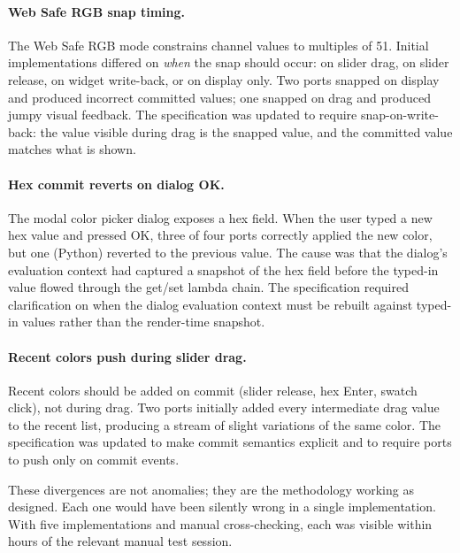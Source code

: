 \documentclass[10pt]{article}
\begin{document}
\paragraph{Web Safe RGB snap timing.} The Web Safe RGB mode constrains
channel values to multiples of 51. Initial implementations differed on
\emph{when} the snap should occur: on slider drag, on slider release, on
widget write-back, or on display only. Two ports snapped on display and
produced incorrect committed values; one snapped on drag and produced
jumpy visual feedback. The specification was updated to require
snap-on-write-back: the value visible during drag is the snapped value,
and the committed value matches what is shown.

\paragraph{Hex commit reverts on dialog OK.} The modal color picker dialog
exposes a hex field. When the user typed a new hex value and pressed OK,
three of four ports correctly applied the new color, but one (Python)
reverted to the previous value. The cause was that the dialog's
evaluation context had captured a snapshot of the hex field before the
typed-in value flowed through the get/set lambda chain. The specification
required clarification on when the dialog evaluation context must be
rebuilt against typed-in values rather than the render-time snapshot.

\paragraph{Recent colors push during slider drag.} Recent colors should be
added on commit (slider release, hex Enter, swatch click), not during
drag. Two ports initially added every intermediate drag value to the
recent list, producing a stream of slight variations of the same color.
The specification was updated to make commit semantics explicit and to
require ports to push only on commit events.

These divergences are not anomalies; they are the methodology working as
designed. Each one would have been silently wrong in a single
implementation. With five implementations and manual cross-checking, each
was visible within hours of the relevant manual test session.
\end{document}
